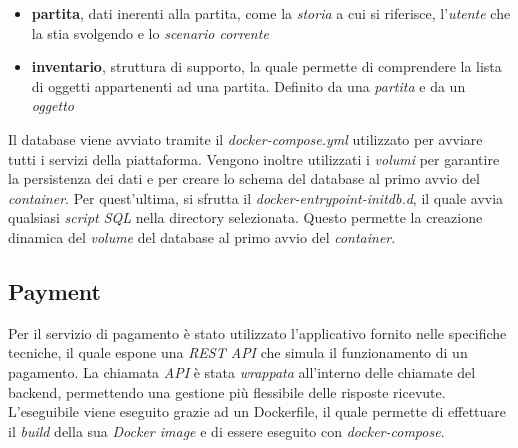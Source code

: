 \documentclass{article}
\begin{document}
\begin{itemize}[label = {-}]
    \item \textbf{partita}, dati inerenti alla partita, come la \textit{storia} a cui si riferisce, l'\textit{utente} che la stia svolgendo e lo \textit{scenario corrente}
    \item \textbf{inventario}, struttura di supporto, la quale permette di comprendere la lista di oggetti appartenenti ad una partita. Definito da una \textit{partita} e da un \textit{oggetto}
\end{itemize}
Il database viene avviato tramite il \textit{docker-compose.yml} utilizzato per avviare tutti i servizi della piattaforma. Vengono inoltre utilizzati i \textit{volumi} per garantire la persistenza dei dati e per creare lo schema del database al primo avvio del \textit{container}. Per quest'ultima, si sfrutta il \textit{docker-entrypoint-initdb.d}, il quale avvia qualsiasi \textit{script SQL} nella directory selezionata. Questo permette la creazione dinamica del \textit{volume} del database al primo avvio del \textit{container}. 

\subsection{Payment}
Per il servizio di pagamento è stato utilizzato l'applicativo fornito nelle specifiche tecniche, il quale espone una \textit{REST API} che simula il funzionamento di un pagamento. La chiamata \textit{API} è stata \textit{wrappata} all'interno delle chiamate del backend, permettendo una gestione più flessibile delle risposte ricevute. L’eseguibile viene eseguito grazie ad un Dockerfile, il quale permette di effettuare il \textit{build} della sua \textit{Docker image} e di essere eseguito con \textit{docker-compose}.
\end{document}
